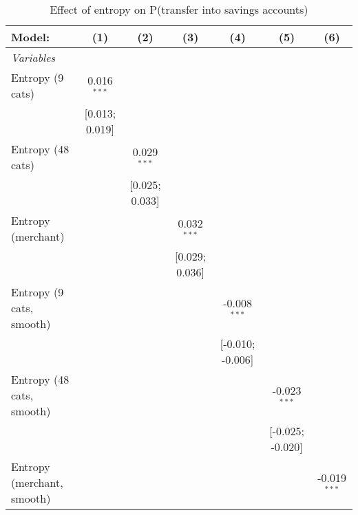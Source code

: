
\begin{table}[htbp]
   \centering
   \tiny
   \begin{threeparttable}[b]
      \caption{\label{tab:reg_has_inflows_main} Effect of entropy on P(transfer into savings accounts)}
      \begin{tabular}{lcccccc}
         \tabularnewline \midrule \midrule
         Model:                     & (1)             & (2)             & (3)             & (4)              & (5)              & (6)\\  
         \midrule
         \emph{Variables}\\
         Entropy (9 cats)           & 0.016$^{***}$   &                 &                 &                  &                  &   \\   
                                    & [0.013; 0.019]  &                 &                 &                  &                  &   \\   
         Entropy (48 cats)          &                 & 0.029$^{***}$   &                 &                  &                  &   \\   
                                    &                 & [0.025; 0.033]  &                 &                  &                  &   \\   
         Entropy (merchant)         &                 &                 & 0.032$^{***}$   &                  &                  &   \\   
                                    &                 &                 & [0.029; 0.036]  &                  &                  &   \\   
         Entropy (9 cats, smooth)   &                 &                 &                 & -0.008$^{***}$   &                  &   \\   
                                    &                 &                 &                 & [-0.010; -0.006] &                  &   \\   
         Entropy (48 cats, smooth)  &                 &                 &                 &                  & -0.023$^{***}$   &   \\   
                                    &                 &                 &                 &                  & [-0.025; -0.020] &   \\   
         Entropy (merchant, smooth) &                 &                 &                 &                  &                  & -0.019$^{***}$\\   

\end{tabular}
\end{threeparttable}
\end{table}
